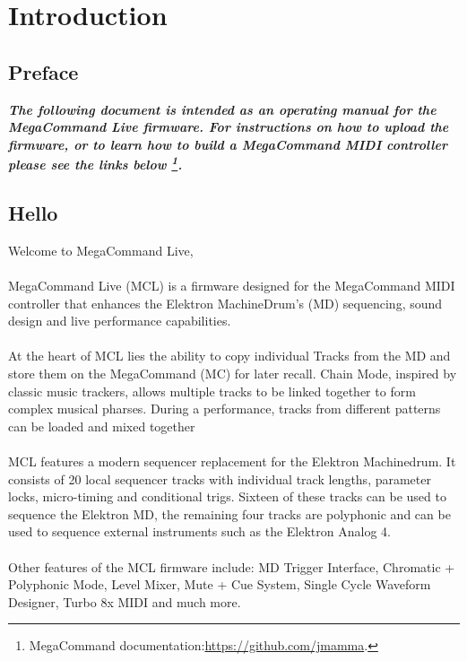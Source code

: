 \chapter{Introduction}

\section{Preface}

\begin{small}
\textbf{\textit{The following document is intended as an operating manual for the MegaCommand Live firmware. For instructions on how to upload the firmware, or to learn how to build a MegaCommand MIDI controller please see the links below \footnote{MegaCommand documentation:\url{https://github.com/jmamma}.}.}}
\end{small}

\section{Hello}
Welcome to MegaCommand Live, 
\\
\\
MegaCommand Live (MCL) is a firmware designed for the MegaCommand MIDI controller that enhances the Elektron MachineDrum's (MD) sequencing, sound design and live performance capabilities.
\\
\\
At the heart of MCL lies the ability to copy individual Tracks from the MD and store them on the MegaCommand (MC) for later recall. Chain Mode, inspired by classic music trackers, allows multiple tracks to be linked together to form complex musical pharses. During a performance, tracks from different patterns can be loaded and mixed together
\\
\\
MCL features a modern sequencer replacement for the Elektron Machinedrum. It consists of 20 local sequencer tracks with individual track lengths, parameter locks, micro-timing and conditional trigs. Sixteen of these tracks can be used to sequence the Elektron MD, the remaining four tracks are polyphonic and can be used to sequence external instruments such as the Elektron Analog 4. 
\\
\\
Other features of the MCL firmware include: MD Trigger Interface, Chromatic + Polyphonic Mode,  Level Mixer, Mute + Cue System, Single Cycle Waveform Designer, Turbo 8x MIDI and much more.
